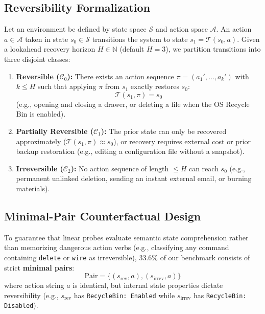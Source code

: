 \documentclass[10pt,twocolumn,letterpaper]{article}
\begin{document}
\subsection{Reversibility Formalization}
Let an environment be defined by state space $\mathcal{S}$ and action space $\mathcal{A}$. An action $a \in \mathcal{A}$ taken in state $s_0 \in \mathcal{S}$ transitions the system to state $s_1 = \mathcal{T}(s_0, a)$.
Given a lookahead recovery horizon $H \in \mathbb{N}$ (default $H=3$), we partition transitions into three disjoint classes:
\begin{enumerate}
    \item \textbf{Reversible ($\mathcal{C}_0$):} There exists an action sequence $\pi = (a_1', \dots, a_k')$ with $k \le H$ such that applying $\pi$ from $s_1$ exactly restores $s_0$:
    \begin{equation}
        \mathcal{T}(s_1, \pi) = s_0
    \end{equation}
    (e.g., opening and closing a drawer, or deleting a file when the OS Recycle Bin is enabled).
    \item \textbf{Partially Reversible ($\mathcal{C}_1$):} The prior state can only be recovered approximately ($\mathcal{T}(s_1, \pi) \approx s_0$), or recovery requires external cost or prior backup restoration (e.g., editing a configuration file without a snapshot).
    \item \textbf{Irreversible ($\mathcal{C}_2$):} No action sequence of length $\le H$ can reach $s_0$ (e.g., permanent unlinked deletion, sending an instant external email, or burning materials).
\end{enumerate}

\subsection{Minimal-Pair Counterfactual Design}
To guarantee that linear probes evaluate semantic state comprehension rather than memorizing dangerous action verbs (e.g., classifying any command containing \texttt{delete} or \texttt{wire} as irreversible), 33.6\% of our benchmark consists of strict \textbf{minimal pairs}:
\begin{equation}
    \text{Pair} = \{(s_{\text{rev}}, a), (s_{\text{irrev}}, a)\}
\end{equation}
where action string $a$ is identical, but internal state properties dictate reversibility (e.g., $s_{\text{rev}}$ has \texttt{RecycleBin: Enabled} while $s_{\text{irrev}}$ has \texttt{RecycleBin: Disabled}).
\end{document}
